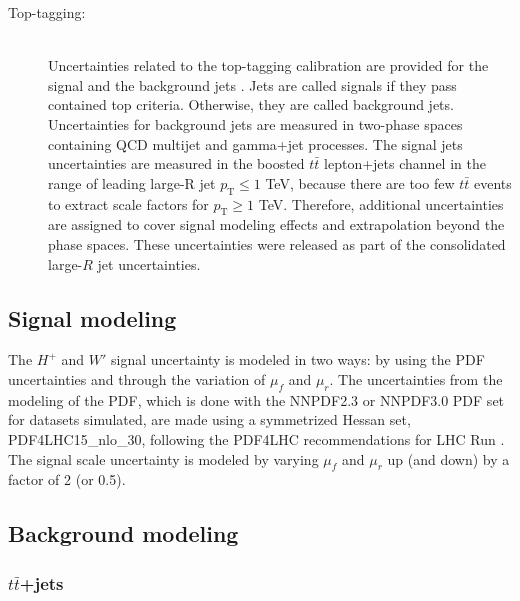 \begin{description}
  \item[Top-tagging:] \mbox{}\\
    Uncertainties related to the top-tagging calibration are provided for the signal and the background jets \cite{JETM-2018-03, ATL-PHYS-PUB-2020-017}. Jets are called signals if they pass contained top criteria. Otherwise, they are called background jets. Uncertainties for background jets are measured in two-phase spaces containing QCD multijet and gamma+jet processes. The signal jets uncertainties are measured in the boosted $t\bar{t}$ lepton+jets channel in the range of leading large-R jet $p_{\text{T}}\leq1$ TeV, because there are too few $t\bar{t}$ events to extract scale factors for $p_{\text{T}}\geq1$ TeV. Therefore, additional uncertainties are assigned to cover signal modeling effects and extrapolation beyond the phase spaces. These uncertainties were released as part of the consolidated large-$R$ jet uncertainties.
    
\end{description}

\subsection{Signal modeling}
\label{subsec:SystOfSigModelling}
\setcounter{num}{2}
The $H^{+}$ and $W'$ signal uncertainty is modeled in two ways: by using the PDF uncertainties and through the variation of $\mu_{f}$ and $\mu_{r}$. The uncertainties from the modeling of the PDF, which is done with the NNPDF2.3 or NNPDF3.0 PDF set for datasets simulated, are made using a symmetrized Hessan set, PDF4LHC15\_nlo\_30, following the PDF4LHC recommendations for LHC Run  \cite{Butterworth:2015oua}. The signal scale uncertainty is modeled by varying $\mu_{f}$ and $\mu_{r}$ up (and down) by a factor of 2 (or 0.5).

\subsection{Background modeling}
\label{subsec:SystOfBkgModeling}

\subsubsection{$t\bar{t}$+jets}
\label{subsec:SystOfTtbar}

